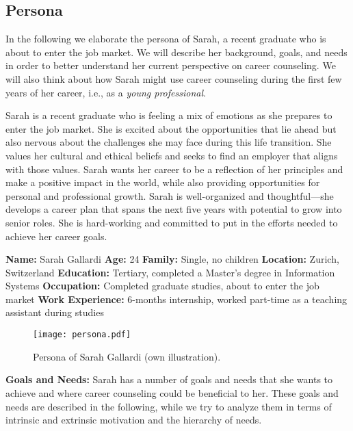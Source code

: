 \subsection{Persona}

In the following we elaborate the persona of Sarah, a recent graduate who is about to enter the job market. We will
describe her background, goals, and needs in order to better understand her current perspective on career counseling.
We will also think about how Sarah might use career counseling during the first few years of her career, i.e., as
a \textit{young professional}.

Sarah is a recent graduate who is feeling a mix of emotions as she prepares to enter the job market.
She is excited about the opportunities that lie ahead but also nervous about the challenges she may face during this life transition.
She values her cultural and ethical beliefs and seeks to find an employer that aligns with those values. Sarah wants her career to be
a reflection of her principles and make a positive impact in the world, while also providing opportunities for personal and professional
growth. Sarah is well-organized and thoughtful---she develops a career plan that spans the next five years with potential to grow into
senior roles. She is hard-working and committed to put in the efforts needed to achieve her career goals.
\vspace*{0.2cm}

\noindent \textbf{Name:} Sarah Gallardi
\newline\noindent\textbf{Age:} 24
\newline\noindent\textbf{Family:} Single, no children
\newline\noindent\textbf{Location:} Zurich, Switzerland
\newline\noindent\textbf{Education:} Tertiary, completed a Master's degree in Information Systems
\newline\noindent\textbf{Occupation:} Completed graduate studies, about to enter the job market
\newline\noindent\textbf{Work Experience:} 6-months internship, worked part-time as a teaching assistant during studies

\begin{figure}[h!]
    \centering
    \caption{Persona of Sarah Gallardi (own illustration).}
    \label{fig:persona}
    \texttt{[image: persona.pdf]}
\end{figure}

\noindent\textbf{Goals and Needs:}
Sarah has a number of goals and needs that she wants to achieve and where career counseling could be beneficial to
her. These goals and needs are described in the following, while we try to analyze them in terms of intrinsic and
extrinsic motivation and the hierarchy of needs.

